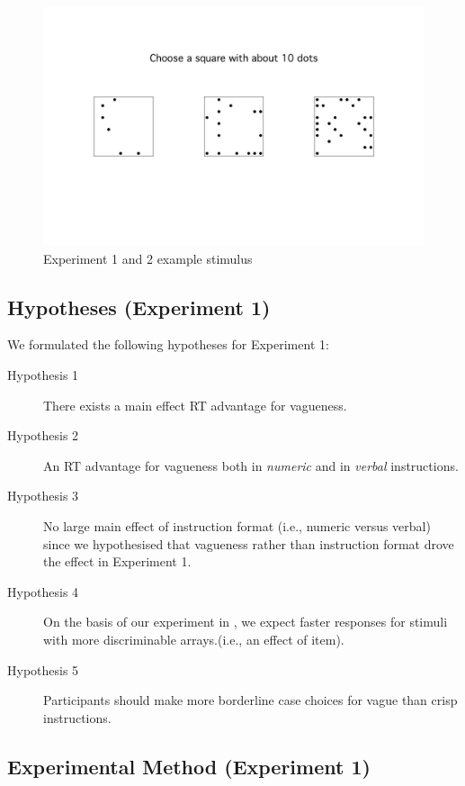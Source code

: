 \begin{figure}[htbp]
\centering
\includegraphics[width=.75\textwidth]{figures/Ce1-example-screenshot}
\caption{Experiment 1 and 2 example stimulus}
\label{Experiment1and2examplestimulus}
\end{figure}

\subsection{Hypotheses (Experiment 1)} 

We formulated the following hypotheses for Experiment 1:

\begin{description}
	\item [Hypothesis 1] There exists a main effect RT advantage for vagueness.
	\item [Hypothesis 2] An RT advantage for vagueness both in \emph{numeric} and in \emph{verbal} instructions.
	\item [Hypothesis 3] No large main effect of instruction format (i.e., numeric versus verbal) since we hypothesised that vagueness rather than instruction format drove the effect in Experiment 1.
	\item [Hypothesis 4] On the basis of our experiment in \citet{green2013utility}, we expect faster responses for stimuli with more discriminable arrays.(i.e., an effect of item).
	\item [Hypothesis 5] Participants should make more borderline case choices for vague than crisp instructions.
\end{description}

\subsection{Experimental Method (Experiment 1)} 

